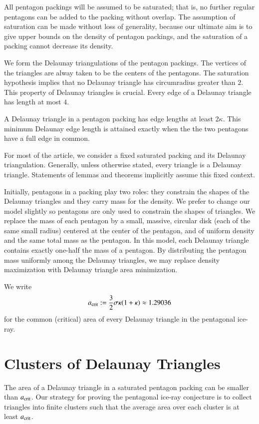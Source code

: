 All pentagon packings will be assumed to be saturated; that is, no
further regular pentagons can be added to the packing without overlap.
The assumption of saturation can be made without loss of generality,
because our ultimate aim is to give upper bounds on the density of
pentagon packings, and the saturation of a packing cannot decrease its
density.

We form the Delaunay triangulations of the pentagon packings.  The
vertices of the triangles are alway taken to be the centers of the
pentagons.  The saturation hypothesis implies that no Delaunay
triangle has circumradius greater than $2$.  This property of Delaunay
triangles is crucial.   Every edge of a Delaunay
triangle has length at most $4$.

A Delaunay triangle in a pentagon packing has edge lengths at least
$2\kappa$.  This minimum Delaunay edge length is attained exactly when
the the two pentagons have a full edge in common.

For most of the article, we consider a fixed saturated packing and its
Delaunay triangulation.  Generally, unless otherwise stated,
every triangle is a  Delaunay triangle.
Statements of lemmas and theorems implicitly
assume this fixed context.

Initially, pentagons in a packing play two roles: they constrain the
shapes of the Delaunay triangles and they carry mass for the density.
We prefer to change our model slightly so pentagons are only used
to constrain the shapes of triangles.  We replace the mass of each
pentagon by a small, massive, circular disk (each of the same small
radius) centered at the center of the pentagon, and of uniform density
and the same total mass as the pentagon.  In this model, each Delaunay
triangle contains exactly one-half the mass of a pentagon.  By
distributing the pentagon mass uniformly among the Delaunay triangles,
we may replace density maximization with Delaunay triangle area
minimization.

We write 
\[
a_\text{crit} := \frac{3}{2}{ \sigma \kappa(1+\kappa)} \approx 1.29036
\] %
for the common (critical) area of every Delaunay triangle in the 
pentagonal ice-ray.

\section{Clusters of Delaunay Triangles}

The area of a Delaunay triangle in a saturated pentagon packing can be
smaller than $a_\text{crit}$.  Our strategy for proving the pentagonal
ice-ray conjecture is to collect triangles into finite clusters such
that the average area over each cluster is at least $a_\text{crit}$.

